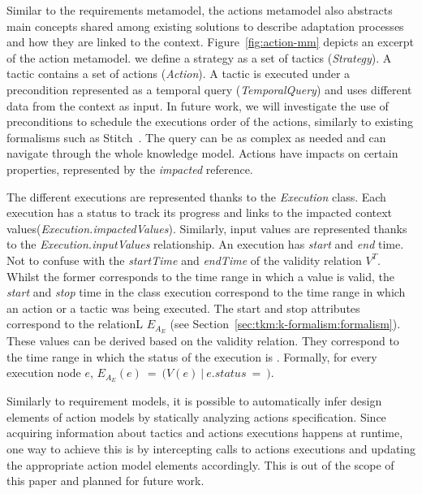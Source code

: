 Similar to the requirements metamodel, the actions metamodel also abstracts main concepts shared among existing solutions to describe adaptation processes and how they are linked to the context. 
Figure~\ref{fig:action-mm} depicts an excerpt of the action metamodel.
we define a strategy as a set of tactics (\textit{Strategy}).
A tactic contains a set of actions (\textit{Action}).
A tactic is executed under a precondition represented as a temporal query (\textit{TemporalQuery}) and uses different data from the context as input.
In future work, we will investigate the use of preconditions to schedule the executions order of the actions, similarly to existing formalisms such as Stitch~\cite{DBLP:journals/jss/ChengG12}.
The query can be as complex as needed and can navigate through the whole knowledge model.
Actions have impacts on certain properties, represented by the \textit{impacted} reference. 

The different executions are represented thanks to the \textit{Execution} class. Each execution has a status to track its progress and links to the impacted context values(\textit{Execution.impactedValues}).
Similarly, input values are represented thanks to the \textit{Execution.inputValues} relationship.
An execution has \textit{start} and \textit{end} time. Not to confuse with the \textit{startTime} and \textit{endTime} of the validity relation $V^T$.
Whilst the former corresponds to the time range in which a value is valid, the \textit{start} and \textit{stop} time in the class execution correspond to the time range in which an action or a tactic was being executed.
The start and stop attributes correspond to the relationL $E_{A_E}$ (see Section~\ref{sec:tkm:k-formalism:formalism}). These values can be derived based on the validity relation.
They correspond to the time range in which the status of the execution is .
Formally, for every execution node $e$, $E_{A_E}(e)~=~(V(e)~|~e.status~=~$$)$.


Similarly to requirement models, it is possible to automatically infer design elements of action models by statically analyzing actions specification.
Since acquiring information about tactics and actions executions happens at runtime, one way to achieve this is by intercepting calls to actions executions and updating the appropriate action model elements accordingly.
This is out of the scope of this paper and planned for future work.